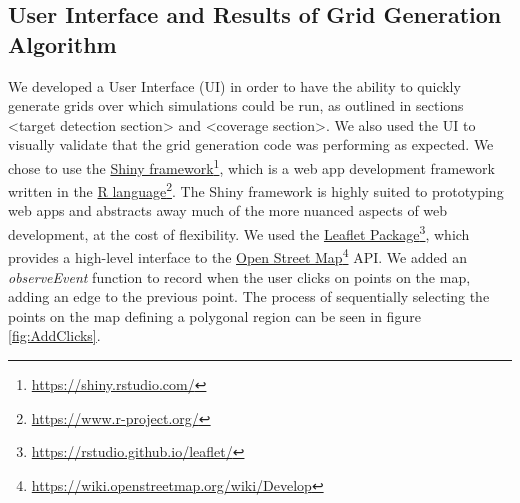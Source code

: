 \subsection{User Interface and Results of Grid Generation Algorithm}
We developed a User Interface (UI) in order to have the ability to quickly generate grids over which simulations could be run, as outlined in sections <target detection section> and <coverage section>. We also used the UI to visually validate that the grid generation code was performing as expected. We chose to use the  \href{https://shiny.rstudio.com/}{Shiny framework}\footnote{\href {https://shiny.rstudio.com/}{https://shiny.rstudio.com/}}, which is a web app development framework written in the \href{https://www.r-project.org/}{R language}\footnote{\href {https://www.r-project.org/}{https://www.r-project.org/}}. The Shiny framework is highly suited to prototyping web apps and abstracts away much of the more nuanced aspects of web development, at the cost of flexibility. We used the \href{https://rstudio.github.io/leaflet/}{Leaflet Package}\footnote{\href {https://rstudio.github.io/leaflet/}{https://rstudio.github.io/leaflet/}}, which provides a high-level interface to the \href{https://wiki.openstreetmap.org/wiki/Develop}{Open Street Map}\footnote{\href {https://wiki.openstreetmap.org/wiki/Develop}{https://wiki.openstreetmap.org/wiki/Develop}} API. We added an \textit{observeEvent} function to record when the user clicks on points on the map, adding an edge to the previous point. The process of sequentially selecting the points on the map defining a polygonal region can be seen in figure \ref{fig:AddClicks}. 

